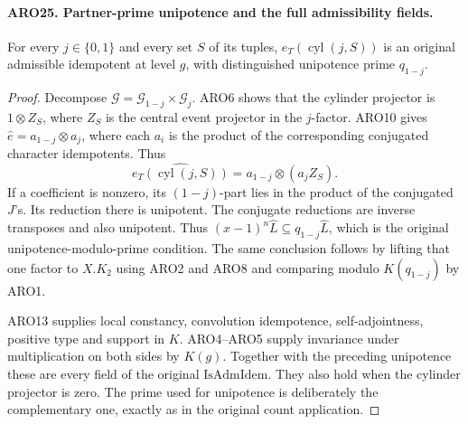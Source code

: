 \documentclass[11pt,a4paper]{article}
\numberwithin{equation}{section}
\theoremstyle{remark}\newtheorem{remark}[theorem]{Remark}
\begin{document}
\paragraph{ARO25. Partner-prime unipotence and the full admissibility fields.}
\label{claim:ARO25}
For every \(j\in\{0,1\}\) and every set \(S\) of its tuples,
\(e_T(\operatorname{cyl}(j,S))\) is an original admissible
idempotent at level \(g\), with distinguished unipotence prime
\(q_{1-j}\).
\begin{proof}
Decompose \(\mathcal G=\mathcal G_{1-j}\times\mathcal G_j\).
ARO6 shows that the cylinder projector is \(1\otimes Z_S\),
where \(Z_S\) is the central event projector in the \(j\)-factor.
ARO10 gives \(\widehat e=a_{1-j}\otimes a_j\), where each
\(a_i\) is the product of the corresponding conjugated character
idempotents.  Thus
\[
       \widehat{e_T(\operatorname{cyl}(j,S))}
                         =a_{1-j}\otimes(a_jZ_S).     \tag{ARO.28}
\]
If a coefficient is nonzero, its \((1-j)\)-part lies in the
product of the conjugated \(J\)'s.  Its reduction there is
unipotent.  The conjugate reductions are inverse transposes and
also unipotent.  Thus \((x-1)^n\widehat L\subseteq
q_{1-j}\widehat L\), which is the original unipotence-modulo-prime
condition.  The same conclusion follows by lifting that one
factor to \(X.K_2\) using ARO2 and ARO8 and comparing modulo
\(K(q_{1-j})\) by ARO1.

ARO13 supplies local constancy, convolution idempotence,
self-adjointness, positive type and support in \(K\).
ARO4--ARO5 supply invariance under multiplication on both sides
by \(K(g)\).  Together with the preceding unipotence these are
every field of the original \(\mathrm{IsAdmIdem}\).  They also
hold when the cylinder projector is zero.  The prime used for
unipotence is deliberately the complementary one, exactly as in
the original count application.
\end{proof}

\end{document}
